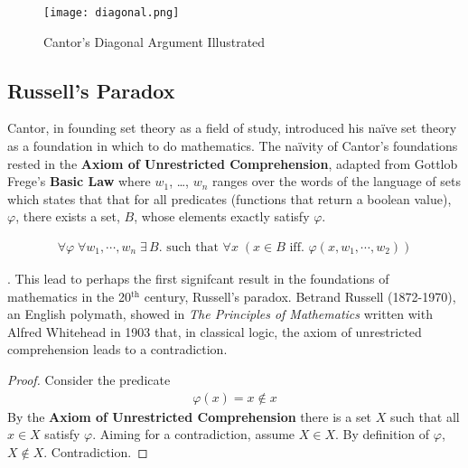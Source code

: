 \begin{figure}[h]
    \texttt{[image: diagonal.png]}
    \centering
    \caption{Cantor's Diagonal Argument Illustrated }
    \label{fig:diagonal}
\end{figure}

\subsection{Russell's Paradox}
Cantor, in founding set theory as a field of study, introduced his na{\"i}ve set
theory \cite{Cantor:1874} as a foundation in which to do mathematics. The
na{\"i}vity of Cantor's foundations rested in the \textbf{Axiom of Unrestricted
Comprehension}, adapted from Gottlob Frege's \textbf{Basic Law }
\cite{frege1884grundlagen} where $w_{1}$, \ldots , $w_{n}$ ranges over the words
of the language of sets which states that that for all predicates (functions
that return a boolean value), $\varphi$, there exists a set, $B$, whose elements
exactly satisfy $\varphi$.

\begin{definition*}
    {\large
    \begin{align*}
        \forall \varphi \; \forall w_{1}, \cdots , w_{n} \; \exists \, B.  \textrm{ such that }
        \forall x  \; (x \in B \textrm{ iff. }  \varphi(x, w_{1},\cdots,w_{2} ))
    \end{align*}
    }%
\end{definition*}

. This lead to perhaps the first signifcant result in the foundations of
mathematics in the 20$^{\textrm{th}}$ century, Russell's paradox. Betrand Russell (1872-1970),
an English polymath, showed in \textit{The Principles of Mathematics}
\cite{russell1903principles} written with Alfred Whitehead in 1903 that, in
classical logic, the axiom of unrestricted comprehension leads to a
contradiction.

\begin{theorem*}
\end{theorem*}

\begin{proof}
    Consider the predicate
    \begin{align*}
        \varphi(x) = x \not\in x
    \end{align*}
    By the \textbf{Axiom of Unrestricted Comprehension} there is a set $X$ such
    that all $x \in X$ satisfy $\varphi$. Aiming for a contradiction, assume
    $X \in X$. By definition of $\varphi$, $X \not\in X$. Contradiction.
\end{proof}

